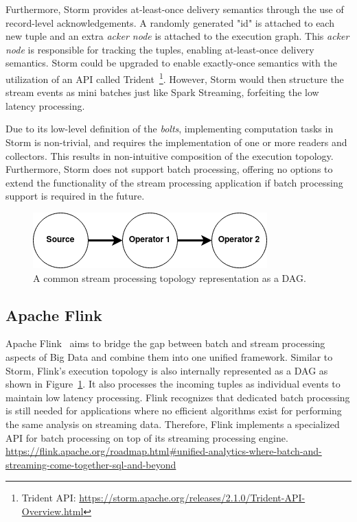 Furthermore, Storm provides at-least-once 
delivery semantics through the use of record-level acknowledgements. A randomly 
generated "id" is attached to each new tuple and an extra \emph{acker node} is attached 
to the execution graph. This \emph{acker node} is responsible for tracking the tuples, 
enabling at-least-once delivery semantics. Storm could be upgraded to enable 
exactly-once semantics with the utilization of an API called
Trident~\footnote{Trident API: \url{https://storm.apache.org/releases/2.1.0/Trident-API-Overview.html}}. 
However, Storm would then structure the stream events as mini batches just like 
Spark Streaming, forfeiting the low latency processing. 

Due to its low-level definition of the \emph{bolts}, implementing computation tasks 
in Storm is non-trivial, and requires the implementation of one or more readers and 
collectors. This results in non-intuitive composition of the execution topology. 
Furthermore, Storm does not support 
batch processing, offering no options to extend the functionality of the stream 
processing application if batch processing support is required in the future. 


\begin{figure}[!htpb]
    \centering
    \includegraphics[width=0.5\linewidth]{fig/dag.png}
    \caption{A common stream processing topology representation as a DAG.} 
    \label{fig:dag_topology}
\end{figure}

\subsection{Apache Flink}%
\label{sub:Apache Flink}

Apache Flink~\cite{flink} aims to bridge the gap between batch and stream processing aspects of 
Big Data and combine them into one unified framework. Similar to Storm, 
Flink's execution topology is also internally represented as a DAG as shown 
in Figure~\ref{fig:dag_topology}. It also processes the incoming tuples as 
individual events to maintain low latency processing. Flink recognizes that
dedicated batch processing is still needed for applications where no efficient algorithms 
exist for performing the same analysis on streaming data. Therefore, Flink implements a 
specialized API for batch processing on top of its streaming processing engine.
 \url{https://flink.apache.org/roadmap.html#unified-analytics-where-batch-and-streaming-come-together-sql-and-beyond} 

